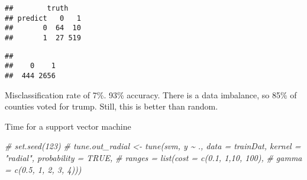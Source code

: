 \documentclass[
]{article}
\newenvironment{Shaded}{\begin{snugshade}}{\end{snugshade}}
\newcommand{\AttributeTok}[1]{\textcolor[rgb]{0.13,0.29,0.53}{#1}}
\newcommand{\CommentTok}[1]{\textcolor[rgb]{0.56,0.35,0.01}{\textit{#1}}}
\newcommand{\ConstantTok}[1]{\textcolor[rgb]{0.56,0.35,0.01}{#1}}
\newcommand{\DecValTok}[1]{\textcolor[rgb]{0.00,0.00,0.81}{#1}}
\newcommand{\FloatTok}[1]{\textcolor[rgb]{0.00,0.00,0.81}{#1}}
\newcommand{\FunctionTok}[1]{\textcolor[rgb]{0.13,0.29,0.53}{\textbf{#1}}}
\newcommand{\NormalTok}[1]{#1}
\newcommand{\OtherTok}[1]{\textcolor[rgb]{0.56,0.35,0.01}{#1}}
\newcommand{\SpecialCharTok}[1]{\textcolor[rgb]{0.81,0.36,0.00}{\textbf{#1}}}
\newcommand{\StringTok}[1]{\textcolor[rgb]{0.31,0.60,0.02}{#1}}
\begin{document}
\begin{Shaded}
\end{Shaded}

\begin{verbatim}
##        truth
## predict   0   1
##       0  64  10
##       1  27 519
\end{verbatim}

\begin{Shaded}
\end{Shaded}

\begin{verbatim}
## 
##    0    1 
##  444 2656
\end{verbatim}

Misclassification rate of 7\%. 93\% accuracy. There is a data imbalance,
so 85\% of counties voted for trump. Still, this is better than random.

Time for a support vector machine

\begin{Shaded}
\begin{Highlighting}[]
\CommentTok{\# set.seed(123)}
\CommentTok{\# tune.out\_radial \textless{}{-} tune(svm, y \textasciitilde{} ., data = trainDat, kernel = "radial",  probability = TRUE,}
\CommentTok{\#                         ranges = list(cost = c(0.1, 1,10, 100),}
\CommentTok{\#                                       gamma = c(0.5, 1, 2, 3, 4)))}
\end{Highlighting}
\end{Shaded}
\end{document}
